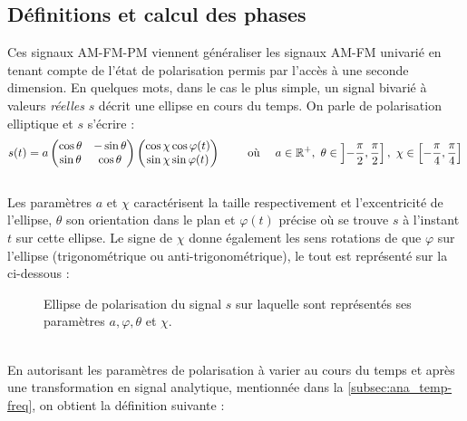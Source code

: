 \subsection{Définitions et calcul des phases} \label{subsec:AM-FM-PM}

Ces signaux AM-FM-PM viennent généraliser les signaux AM-FM univarié en tenant compte de l'état de polarisation permis par l'accès à une seconde dimension. 
En quelques mots, dans le cas le plus simple, un signal bivarié à valeurs \emph{réelles} $s$ décrit une ellipse en cours du temps. 
On parle de polarisation elliptique et $s$ s'écrire :
\[s(t) = a \begin{pmatrix} \cos\theta & -\sin\theta \\ \sin\theta  &  \cos\theta \end{pmatrix} \begin{pmatrix} \cos\chi \cos\varphi(t) \\ \sin\chi \sin\varphi(t) \end{pmatrix}  \qquad \text{ où }\quad  a\in\mathbb{R}^+,\ \theta \in \left]-\frac{\pi}{2}, \frac{\pi}{2}\right],\ \chi \in \left[-\frac{\pi}{4}, \frac{\pi}{4}\right] \]
\\
Les paramètres $a$ et $\chi$ caractérisent la taille respectivement et l'excentricité de l'ellipse, $\theta$ son orientation dans le plan et $\varphi(t)$ précise où se trouve $s$ à l'instant $t$ sur cette ellipse. Le signe de $\chi$ donne également les sens rotations de que $\varphi$ sur l'ellipse (trigonométrique ou anti-trigonométrique), le tout est représenté sur la  ci-dessous :
\begin{figure}[H]
	
	\caption[\DONE Ellipse de polarisation d'un signal bivarié réel]{Ellipse de polarisation du signal $s$ sur laquelle sont représentés ses paramètres $a,\varphi,\theta$ et $\chi$.}
	\label{fig:ellipse2polar}
\end{figure}
\skipl \\
En autorisant les paramètres de polarisation à varier au cours du temps et après une transformation en signal analytique, mentionnée dans la \cref{subsec:ana_temp-freq}, on obtient la définition suivante :
\\
